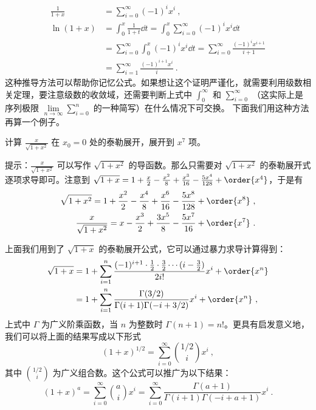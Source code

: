 \begin{equation}
\begin{aligned}
\frac{1}{1+x}&=\sum_{i=0}^{\infty} (-1)^i x^i~,\\
\ln(1+x)&=\int_0^x \frac{1}{1+t}\dd t = \int_0^x \sum_{i=0}^{\infty} (-1)^i x^i\dd t \\
&= \sum_{i=0}^{\infty} \int_0^x(-1)^i x^i\dd t = \sum_{i=0}^{\infty} \frac{(-1)^i x^{i+1}}{i+1}\\
&= \sum_{i=1}^{\infty} \frac{(-1)^{i+1} x^{i}}{i}~.
\end{aligned}
\end{equation}
这种推导方法可以帮助你记忆公式。如果想让这个证明严谨化，就需要利用级数相关定理，要注意级数的收敛域，还需要判断上式中 $\int_0^{\infty}$ 和 $\sum_{i=0}^{\infty}$ （这实际上是序列极限 $\lim\limits_{n\rightarrow \infty} \sum_{i=0}^{n}$ 的一种简写）在什么情况下可交换。
下面我们用这种方法再算一个例子。
\begin{exercise}{}
计算 $\frac{x}{\sqrt{1+x^2}}$ 在 $x_0=0$ 处的泰勒展开，展开到 $x^7$ 项。
\end{exercise}
提示：$\frac{x}{\sqrt{1+x^2}}$ 可以写作 $\sqrt{1+x^2}$ 的导函数。那么只需要对 $\sqrt{1+x^2}$ 的泰勒展开式逐项求导即可。注意到 $\sqrt{1+x}=1+\frac{x}{2}-\frac{x^2}{8}+\frac{x^3}{16}-\frac{5x^4}{128}+\order{x^4}$，于是有
\begin{equation}
\begin{aligned}
\sqrt{1+x^2}=1+\frac{x^2}{2}-\frac{x^4}{8}+\frac{x^6}{16}-\frac{5x^8}{128}+\order{x^8}~,\\
\frac{x}{\sqrt{1+x^2}}=x-\frac{x^3}{2}+\frac{3x^5}{8}-\frac{5x^7}{16}+\order{x^7}~.
\end{aligned}
\end{equation}

上面我们用到了 $\sqrt{1+x}$ 的泰勒展开公式，它可以通过暴力求导计算得到：
\begin{equation}
\begin{aligned}
\sqrt{1+x}&=1+\sum_{i=1}^n\frac{(-1)^{i+1} \cdot \frac{1}{2}\cdot \frac{3}{2}\cdots (i-\frac{3}{2})}{2i!}x^i +\order{x^n}\\
&=1+\sum_{i=1}^n\frac{\Gamma(3/2)}{\Gamma(i+1)\Gamma(-i+3/2)}x^i +\order{x^n}~,
\end{aligned}
\end{equation}
上式中 $\Gamma$ 为广义阶乘函数，当 $n$ 为整数时 $\Gamma(n+1)=n!$。更具有启发意义地，我们可以将上面的结果写成以下形式
\begin{equation}
(1+x)^{1/2}=\sum_{i=0}^{\infty}{1/2\choose i}x^i~,
\end{equation}
其中 ${1/2\choose i}$ 为广义组合数。这个公式可以推广为以下结果：
\begin{equation}
(1+x)^{a}=\sum_{i=0}^{\infty}{a\choose i}x^i=\sum_{i=0}^{\infty}\frac{\Gamma(a+1)}{\Gamma(i+1)\Gamma(-i+a+1)}x^i~.
\end{equation}

